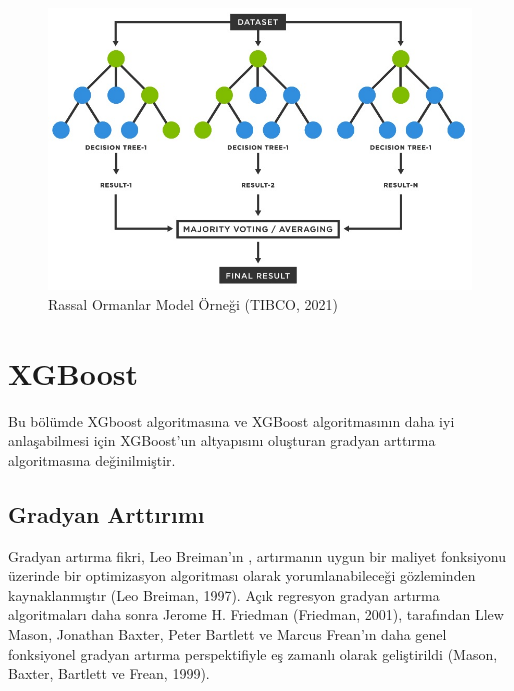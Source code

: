 \documentclass[12pt,twoside]{deuthesis}
\begin{document}
\begin{figure}

{\centering \includegraphics[width=1\linewidth,height=0.48\textheight]{figure/rf_example} 

}

\caption{Rassal Ormanlar Model Örneği (TIBCO, 2021)}\label{fig:unnamed-chunk-7}
\end{figure}
\hypertarget{xgboost}{%
\section{XGBoost}\label{xgboost}}

Bu bölümde XGboost algoritmasına ve XGBoost algoritmasının daha iyi anlaşabilmesi için XGBoost'un altyapısını oluşturan gradyan arttırma algoritmasına değinilmiştir.

\hypertarget{gradyan-arttux131rux131mux131}{%
\subsection{Gradyan Arttırımı}\label{gradyan-arttux131rux131mux131}}

Gradyan artırma fikri, Leo Breiman'ın , artırmanın uygun bir maliyet fonksiyonu üzerinde bir optimizasyon algoritması olarak yorumlanabileceği gözleminden kaynaklanmıştır (Leo Breiman, 1997). Açık regresyon gradyan artırma algoritmaları daha sonra Jerome H. Friedman (Friedman, 2001), tarafından Llew Mason, Jonathan Baxter, Peter Bartlett ve Marcus Frean'ın daha genel fonksiyonel gradyan artırma perspektifiyle eş zamanlı olarak geliştirildi (Mason, Baxter, Bartlett ve Frean, 1999).
\end{document}

